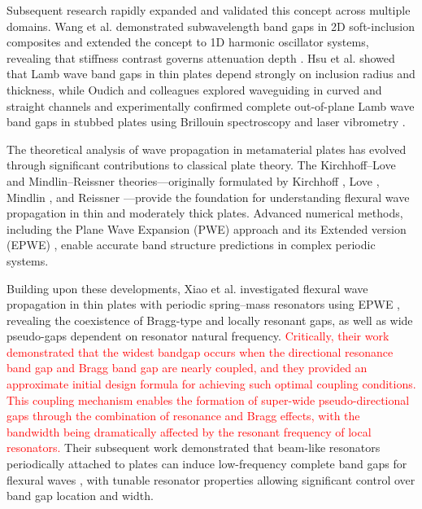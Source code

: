 \documentclass[review,numbers,sort&compress]{elsarticle}
\begin{document}
Subsequent research rapidly expanded and validated this concept across multiple domains. Wang et al. demonstrated subwavelength band gaps in 2D soft-inclusion composites \cite{Wang2004} and extended the concept to 1D harmonic oscillator systems, revealing that stiffness contrast governs attenuation depth \cite{Wang2005}. Hsu et al. \cite{Hsu2007} showed that Lamb wave band gaps in thin plates depend strongly on inclusion radius and thickness, while Oudich and colleagues explored waveguiding in curved and straight channels \cite{Oudich2010} and experimentally confirmed complete out-of-plane Lamb wave band gaps in stubbed plates using Brillouin spectroscopy and laser vibrometry \cite{Oudich2011}.


The theoretical analysis of wave propagation in metamaterial plates has evolved through significant contributions to classical plate theory. The Kirchhoff--Love and Mindlin--Reissner theories---originally formulated by Kirchhoff \cite{Kirchhoff1850}, Love \cite{Love1888}, Mindlin \cite{Mindlin1951}, and Reissner \cite{Reissner1945}---provide the foundation for understanding flexural wave propagation in thin and moderately thick plates. Advanced numerical methods, including the Plane Wave Expansion (PWE) approach \cite{Phani2006} and its Extended version (EPWE) \cite{Hsue2005, Laude2009}, enable accurate band structure predictions in complex periodic systems.

Building upon these developments, Xiao et al. investigated flexural wave propagation in thin plates with periodic spring--mass resonators using EPWE \cite{Xiao_2012}, revealing the coexistence of Bragg-type and locally resonant gaps, as well as wide pseudo-gaps dependent on resonator natural frequency. \textcolor{red}{Critically, their work demonstrated that the widest bandgap occurs when the directional resonance band gap and Bragg band gap are nearly coupled, and they provided an approximate initial design formula for achieving such optimal coupling conditions. This coupling mechanism enables the formation of super-wide pseudo-directional gaps through the combination of resonance and Bragg effects, with the bandwidth being dramatically affected by the resonant frequency of local resonators.} Their subsequent work demonstrated that beam-like resonators periodically attached to plates can induce low-frequency complete band gaps for flexural waves \cite{Xiao_2014}, with tunable resonator properties allowing significant control over band gap location and width.
\end{document}
